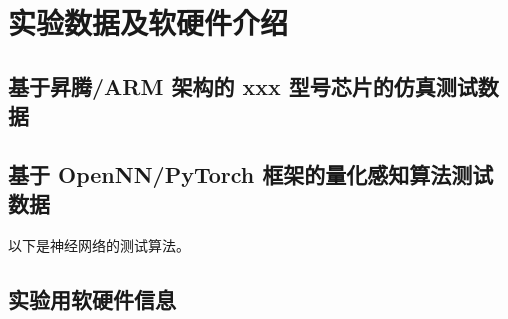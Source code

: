 \section{实验数据及软硬件介绍}


\subsection{基于昇腾/ARM 架构的 xxx 型号芯片的仿真测试数据}


\subsection{基于 OpenNN/PyTorch 框架的量化感知算法测试数据}

以下是神经网络的测试算法。

\subsection{实验用软硬件信息}